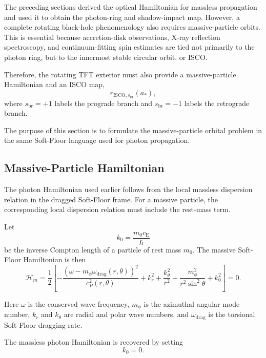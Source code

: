 The preceding sections derived the optical Hamiltonian for massless propagation and used it to obtain the photon-ring and shadow-impact map. However, a complete rotating black-hole phenomenology also requires massive-particle orbits. This is essential because accretion-disk observations, X-ray reflection spectroscopy, and continuum-fitting spin estimates are tied not primarily to the photon ring, but to the innermost stable circular orbit, or ISCO.

Therefore, the rotating TFT exterior must also provide a massive-particle Hamiltonian and an ISCO map,
\begin{equation}
    r_{\mathrm{ISCO},s_{\mathrm{br}}}(a_\ast),
\end{equation}
where $s_{\mathrm{br}}=+1$ labels the prograde branch and $s_{\mathrm{br}}=-1$ labels the retrograde branch.

The purpose of this section is to formulate the massive-particle orbital problem in the same Soft-Floor language used for photon propagation.

\subsection{Massive-Particle Hamiltonian}

The photon Hamiltonian used earlier follows from the local massless dispersion relation in the dragged Soft-Floor frame. For a massive particle, the corresponding local dispersion relation must include the rest-mass term.

Let
\begin{equation}
    k_0 = \frac{m_0 c_{\mathrm{E}}}{\hbar}
\end{equation}
be the inverse Compton length of a particle of rest mass $m_0$. The massive Soft-Floor Hamiltonian is then
\begin{equation}
    \mathcal{H}_m = \frac{1}{2} \left[ - \frac{ \left( \omega - m_{\phi}\omega_{\mathrm{drag}}(r,\theta) \right)^2 }{ c_P^2(r,\theta) } + k_r^2 + \frac{k_{\theta}^2}{r^2} + \frac{m_{\phi}^2}{r^2\sin^2\theta} + k_0^2 \right] = 0.
\end{equation}

Here $\omega$ is the conserved wave frequency, $m_{\phi}$ is the azimuthal angular mode number, $k_r$ and $k_{\theta}$ are radial and polar wave numbers, and $\omega_{\mathrm{drag}}$ is the torsional Soft-Floor dragging rate.

The massless photon Hamiltonian is recovered by setting
\begin{equation}
    k_0 = 0.
\end{equation}

